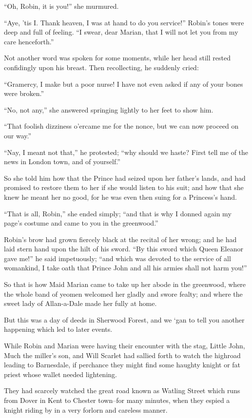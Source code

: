 ``Oh, Robin, it is you!'' she murmured.

``Aye, 'tis I. Thank heaven, I was at hand to do you service!'' Robin's
tones were deep and full of feeling. ``I swear, dear Marian, that I will
not let you from my care henceforth.''

Not another word was spoken for some moments, while her head still
rested confidingly upon his breast. Then recollecting, he suddenly
cried:

``Gramercy, I make but a poor nurse! I have not even asked if any of
your bones were broken.''

``No, not any,'' she answered springing lightly to her feet to show him.

``That foolish dizziness o'ercame me for the nonce, but we can now
proceed on our way.''

``Nay, I meant not that,'' he protested; ``why should we haste? First
tell me of the news in London town, and of yourself.''

So she told him how that the Prince had seized upon her father's lands,
and had promised to restore them to her if she would listen to his suit;
and how that she knew he meant her no good, for he was even then suing
for a Princess's hand.

``That is all, Robin,'' she ended simply; ``and that is why I donned
again my page's costume and came to you in the greenwood.''

Robin's brow had grown fiercely black at the recital of her wrong; and
he had laid stern hand upon the hilt of his sword. ``By this sword which
Queen Eleanor gave me!'' he said impetuously; ``and which was devoted to
the service of all womankind, I take oath that Prince John and all his
armies shall not harm you!''

So that is how Maid Marian came to take up her abode in the greenwood,
where the whole band of yeomen welcomed her gladly and swore fealty; and
where the sweet lady of Allan-a-Dale made her fully at home.

But this was a day of deeds in Sherwood Forest, and we `gan to tell you
another happening which led to later events.

While Robin and Marian were having their encounter with the stag, Little
John, Much the miller's son, and Will Scarlet had sallied forth to watch
the highroad leading to Barnesdale, if perchance they might find some
haughty knight or fat priest whose wallet needed lightening.

They had scarcely watched the great road known as Watling Street which
runs from Dover in Kent to Chester town--for many minutes, when they
espied a knight riding by in a very forlorn and careless manner.

